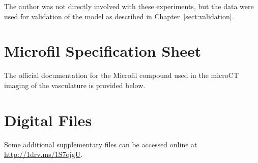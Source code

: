 \begin{appendices}
The author was not directly involved with these experiments, but the data were
used for validation of the model as described in Chapter~\ref{sect:validation}.





\chapter{Microfil Specification Sheet}
\label{appendix:microfil_specs} %

The official documentation for the Microfil compound used in the microCT imaging
of the vasculature is provided below.




\chapter{Digital Files}
\label{appendix:digital_files} %

Some additional supplementary files can be accessed online at
\href{http://1drv.ms/1S7qigU}{http://1drv.ms/1S7qigU}.

\makeatletter
	\def\toclevel@chapter{0}
\makeatother

\end{appendices}